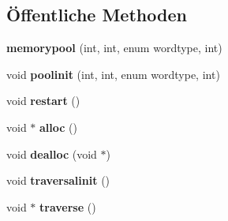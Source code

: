 \subsection*{Öffentliche Methoden}
\begin{DoxyCompactItemize}
\item 
\hypertarget{classtetgenmesh_1_1memorypool_a449ea74f5d521c07fbcc671d727719f7}{{\bfseries memorypool} (int, int, enum wordtype, int)}\label{classtetgenmesh_1_1memorypool_a449ea74f5d521c07fbcc671d727719f7}

\item 
\hypertarget{classtetgenmesh_1_1memorypool_a0b3e8b6216003461d92675f654c9e560}{void {\bfseries poolinit} (int, int, enum wordtype, int)}\label{classtetgenmesh_1_1memorypool_a0b3e8b6216003461d92675f654c9e560}

\item 
\hypertarget{classtetgenmesh_1_1memorypool_a8a34eeaa526e3a27ac9187ff1ead2938}{void {\bfseries restart} ()}\label{classtetgenmesh_1_1memorypool_a8a34eeaa526e3a27ac9187ff1ead2938}

\item 
\hypertarget{classtetgenmesh_1_1memorypool_a9631e38a788a91ae067a756232b515ab}{void $\ast$ {\bfseries alloc} ()}\label{classtetgenmesh_1_1memorypool_a9631e38a788a91ae067a756232b515ab}

\item 
\hypertarget{classtetgenmesh_1_1memorypool_a0329d16675985efd7fd1e0a0630cabf7}{void {\bfseries dealloc} (void $\ast$)}\label{classtetgenmesh_1_1memorypool_a0329d16675985efd7fd1e0a0630cabf7}

\item 
\hypertarget{classtetgenmesh_1_1memorypool_a623b101e4e2f249d8b7e5dba65c3f7e2}{void {\bfseries traversalinit} ()}\label{classtetgenmesh_1_1memorypool_a623b101e4e2f249d8b7e5dba65c3f7e2}

\item 
\hypertarget{classtetgenmesh_1_1memorypool_a151fe73459d0fa9a7262d0030fecf291}{void $\ast$ {\bfseries traverse} ()}\label{classtetgenmesh_1_1memorypool_a151fe73459d0fa9a7262d0030fecf291}

\end{DoxyCompactItemize}

